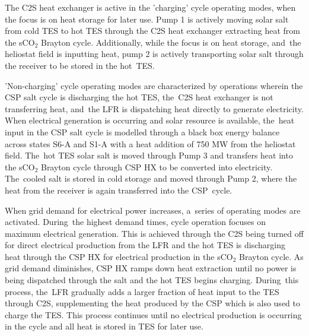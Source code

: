 \documentclass[sustainability,article,accept,moreauthors,pdftex]{Definitions/mdpi}
\begin{document}
\begin{paracol}{2}
The C2S heat exchanger is active in the 'charging' cycle operating modes, when the focus is on heat storage for later use. Pump 1 is actively moving solar salt from cold TES to hot TES through the C2S heat exchanger extracting heat from the sCO$_2$ Brayton cycle. Additionally, while the focus is on heat storage, and~the heliostat field is inputting heat, pump 2 is actively transporting solar salt through the receiver to be stored in the hot~TES.

'Non-charging' cycle operating modes are characterized by operations wherein the CSP salt cycle is discharging the hot TES, the~C2S heat exchanger is not transferring heat, and~the LFR is dispatching heat directly to generate electricity. When electrical generation is occurring and solar resource is available, the~heat input in the CSP salt cycle is modelled through a black box energy balance across states S6-A and S1-A with a heat addition of 750 MW from the heliostat field. The~hot TES solar salt is moved through Pump 3 and transfers heat into the sCO$_{2}$ Brayton cycle through CSP HX to be converted into electricity. The~cooled salt is stored in cold storage and moved through Pump 2, where the heat from the receiver is again transferred into the CSP~cycle. 

When grid demand for electrical power increases, a~series of operating modes are activated. During~the highest demand times, cycle operation focuses on maximum electrical generation. This is achieved through the C2S being turned off for direct electrical production from the LFR and the hot TES is discharging heat through the CSP HX for electrical production in the sCO$_2$ Brayton cycle. %
{As grid demand diminishes, CSP HX ramps down heat extraction until no power is being dispatched through the salt and the hot TES begins charging. During~this process, the~LFR gradually adds a larger fraction of heat input to the TES through C2S, supplementing the heat produced by the CSP which is also used to charge the TES. This process continues until no electrical production is occurring in the cycle and all heat is stored in TES for later use.}




\end{paracol}
\end{document}
